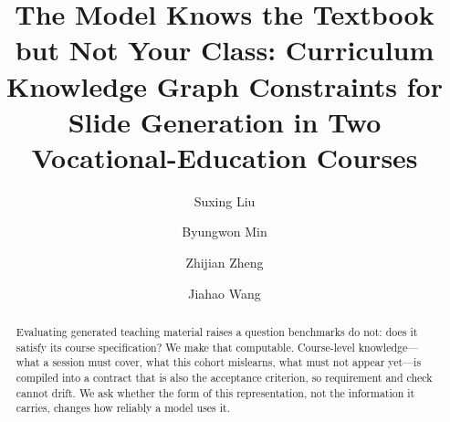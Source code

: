 \documentclass[review,12pt]{elsarticle}
\renewcommand{\_}{\kgunderscore\allowbreak}
\begin{document}
\makeatletter\renewcommand{\baselinestretch}{1}\selectfont\makeatother
\begin{frontmatter}

\title{The Model Knows the Textbook but Not Your Class: Curriculum Knowledge
Graph Constraints for Slide Generation in Two Vocational-Education Courses}

\author[a1,a2]{Suxing Liu}

\author[a1]{Byungwon Min}

\author[a3]{Zhijian Zheng}

\author[a4]{Jiahao Wang}






\begin{abstract}
\begin{singlespace}\small
Evaluating generated teaching material raises a question benchmarks do not: does
it satisfy its course specification? We make that computable. Course-level
knowledge---what a session must cover, what this cohort mislearns, what must not
appear yet---is compiled into a contract that is also the acceptance criterion,
so requirement and check cannot drift. We ask whether the form of this
representation, not the information it carries, changes how reliably a model
uses it.


\end{singlespace}
\end{abstract}
\end{frontmatter}
\end{document}
